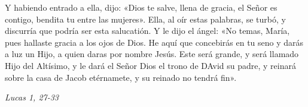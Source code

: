\documentclass[../../devocionario.tex]{subfiles}
\begin{document}
    Y habiendo entrado a ella, dijo: «Dios te salve, llena de gracia, el Señor es contigo, bendita tu entre las mujeres». 
    Ella, al oír estas palabras, se turbó, y discurría que podría ser esta salucatión. Y le dijo el ángel: «No temas, María, 
    pues hallaste gracia a los ojos de Dios. He aquí que concebirás en tu seno y darás a luz un Hijo, a quien daras por 
    nombre Jesús. Este será grande, y será llamado Hijo del Altísimo, y le dará el Señor Dios el trono de DAvid su padre, 
    y reinará sobre la casa de Jacob etérnamete, y su reinado no tendrá fin».

    \begin{flushright}
        \emph{Lucas 1, 27-33}
    \end{flushright}
\end{document}
